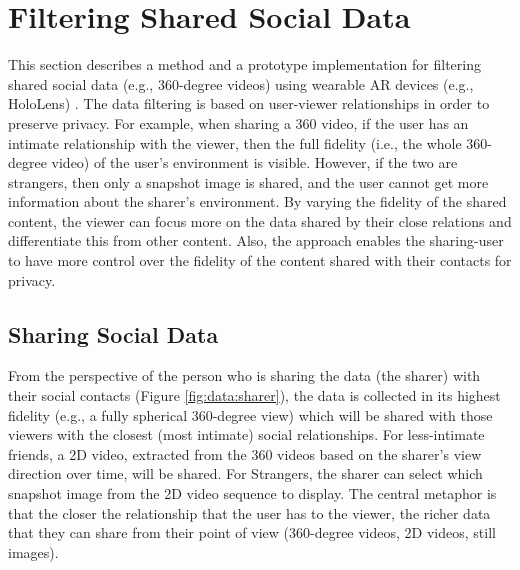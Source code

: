 \section{Filtering Shared Social Data}
\label{sec:surrounding:360}

This section describes a method and a prototype implementation for filtering shared social data (e.g., 360-degree videos) using wearable AR devices (e.g., HoloLens) \cite{Nassani2018a}. The data filtering is based on user-viewer relationships in order to preserve privacy. For example, when sharing a 360 video, if the user has an intimate relationship with the viewer, then the full fidelity (i.e., the whole 360-degree video) of the user's environment is visible. However, if the two are strangers, then only a snapshot image is shared, and the user cannot get more information about the sharer's environment. By varying the fidelity of the shared content, the viewer can focus more on the data shared by their close relations and differentiate this from other content. Also, the approach enables the sharing-user to have more control over the fidelity of the content shared with their contacts for privacy.



\subsection{Sharing Social Data}

From the perspective of the person who is sharing the data (the sharer) with their social contacts (Figure \ref{fig:data:sharer}), the data is collected in its highest fidelity (e.g., a fully spherical 360-degree view) which will be shared with those viewers with the closest (most intimate) social relationships. For less-intimate friends, a 2D video, extracted from the 360 videos based on the sharer's view direction over time, will be shared. For Strangers, the sharer can select which snapshot image from the 2D video sequence to display. The central metaphor is that the closer the relationship that the user has to the viewer, the richer data that they can share from their point of view (360-degree videos, 2D videos, still images).

